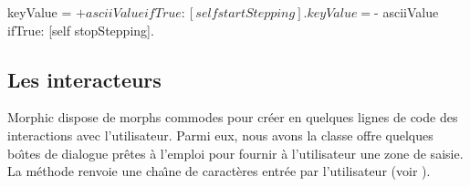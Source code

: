 \documentclass[a4paper,10pt,twoside]{book}
\begin{document}

\begin{code}{}
	keyValue = $+ asciiValue 
		ifTrue: [self startStepping].
	keyValue = $- asciiValue
		ifTrue: [self stopStepping].
\end{code}


\subsection{Les interacteurs} %

Morphic dispose de morphs commodes pour cr\'eer en quelques lignes de
code des interactions avec l'utilisateur. Parmi eux, nous avons la
classe  offre quelques bo\^{\i}tes de dialogue
pr\^etes \`a l'emploi pour fournir \`a l'utilisateur une zone de saisie.
La m\'ethode  renvoie
une cha\^{\i}ne de caract\`eres entr\'ee par l'utilisateur (voir
).
\end{document}
